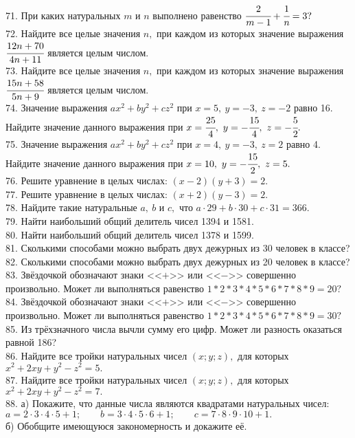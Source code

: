 71. При каких натуральных $m$ и $n$ выполнено равенство $\cfrac{2}{m-1}+\cfrac{1}{n}=3?$\\
72. Найдите все целые значения $n,$ при каждом из которых значение выражения $\cfrac{12n+70}{4n+11}$ является целым числом.\\
73. Найдите все целые значения $n,$ при каждом из которых значение выражения $\cfrac{15n+58}{5n+9}$ является целым числом.\\
74. Значение выражения $ax^2+by^2+cz^2$ при $x=5,\ y=-3,\ z=-2$ равно 16. Найдите значение данного выражения при $x=\cfrac{25}{4},\ y=-\cfrac{15}{4},\ z=-\cfrac{5}{2}.$\\
75. Значение выражения $ax^2+by^2+cz^2$ при $x=4,\ y=-3,\ z=2$ равно 4. Найдите значение данного выражения при $x=10,\ y=-\cfrac{15}{2},\ z=5.$\\
76. Решите уравнение в целых числах: $(x-2)(y+3)=2.$\\
77. Решите уравнение в целых числах: $(x+2)(y-3)=2.$\\
78. Найдите такие натуральные $a,\ b$ и $c,$ что $a\cdot29+b\cdot30+c\cdot31=366.$\\
79. Найти наибольший общий делитель чисел 1394 и 1581.\\
80. Найти наибольший общий делитель чисел 1378 и 1599.\\
81. Сколькими способами можно выбрать двух дежурных из 30 человек в классе?\\
82. Сколькими способами можно выбрать двух дежурных из 20 человек в классе?\\
83. Звёздочкой обозначают знаки <<$+$>> или <<$-$>> совершенно произвольно. Может ли выполняться равенство $1*2*3*4*5*6*7*8*9=20?$\\
84. Звёздочкой обозначают знаки <<$+$>> или <<$-$>> совершенно произвольно. Может ли выполняться равенство $1*2*3*4*5*6*7*8*9=30?$\\
85. Из трёхзначного числа вычли сумму его цифр. Может ли разность оказаться равной 186?\\
86. Найдите все тройки натуральных чисел $(x;y;z),$ для которых $x^2+2xy+y^2-z^2=5.$\\
87. Найдите все тройки натуральных чисел $(x;y;z),$ для которых $x^2+2xy+y^2-z^2=7.$\\
88. а) Покажите, что данные числа являются квадратами натуральных чисел:\\
$a=2\cdot3\cdot4\cdot5+1;\qquad b=3\cdot4\cdot5\cdot6+1;\qquad c=7\cdot8\cdot9\cdot10+1.$\\
б) Обобщите имеющуюся закономерность и докажите её.\\
